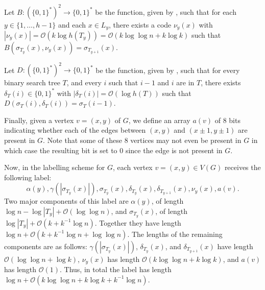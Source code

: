 \documentclass[kpfonts]{patmorin}
\newcommand{\Oh}{\mathcal{O}}
\begin{document}
Let $B:(\{0,1\}^{*})^2\to\{0,1\}^*$ be the function, given by , such that
for each $y\in\{1,\ldots,h-1\}$ and each $x\in L_{y}$,
there exists a code $\nu_{y}(x)$ with $|\nu_{y}(x)|=\Oh(k\log h(T_{y}))=\Oh(k\log\log n+k \log k)$ such that $B(\sigma_{T_{y}}(x),\nu_{y}(x))=\sigma_{T_{y+1}}(x)$.

Let $D:(\{0,1\}^{*})^2\to\{0,1\}^*$ be the function, given by , such that for every binary search tree $T$, and every $i$ such that $i-1$ and $i$ are in $T$, there exists $\delta_T(i) \in \{0,1\}^*$ with $|\delta_T(i)|=\Oh(\log h(T))$ such that
$D(\sigma_T(i),\delta_T(i))=\sigma_T(i-1)$.

Finally, given a vertex $v=(x,y)$ of $G$, we define
an array $a(v)$ of $8$ bits indicating whether each of the edges between $(x,y)$ and $(x\pm 1,y\pm 1)$ are present in $G$. Note that some of these $8$ vertices may not even be present in $G$ in which case the resulting bit is set to $0$ since the edge is not present in $G$.

Now, in the labelling scheme for $G$, each vertex $v=(x,y)\in V(G)$ receives the following label:
\[
\alpha(y), \gamma(|\sigma_{T_y}(x)|), \sigma_{T_y}(x), \delta_{T_y}(x), \delta_{T_{y+1}}(x), \nu_y(x), a(v).
\]
Two major components of this label are $\alpha(y)$, of length $\log n - \log|T_y| + \Oh(\log\log n)$,
and $\sigma_{T_y}(x)$, of length $\log|T_y| + \Oh(k+k^{-1}\log n)$.
Together they have length $\log n + \Oh(k+k^{-1}\log n+\log\log n)$.
The lengths of the remaining components are as follows:
$\gamma(|\sigma_{T_y}(x)|)$,
$\delta_{T_y}(x)$, and $\delta_{T_{y+1}}(x)$
 have length $\Oh(\log\log n + \log k)$, $\nu_y(x)$ has length $\Oh(k\log\log n + k\log k)$, and $a(v)$ has length $\Oh(1)$.
Thus, in total the label has length  $\log n+ \Oh(k\log\log n + k\log k + k^{-1}\log n)$.
\end{document}
